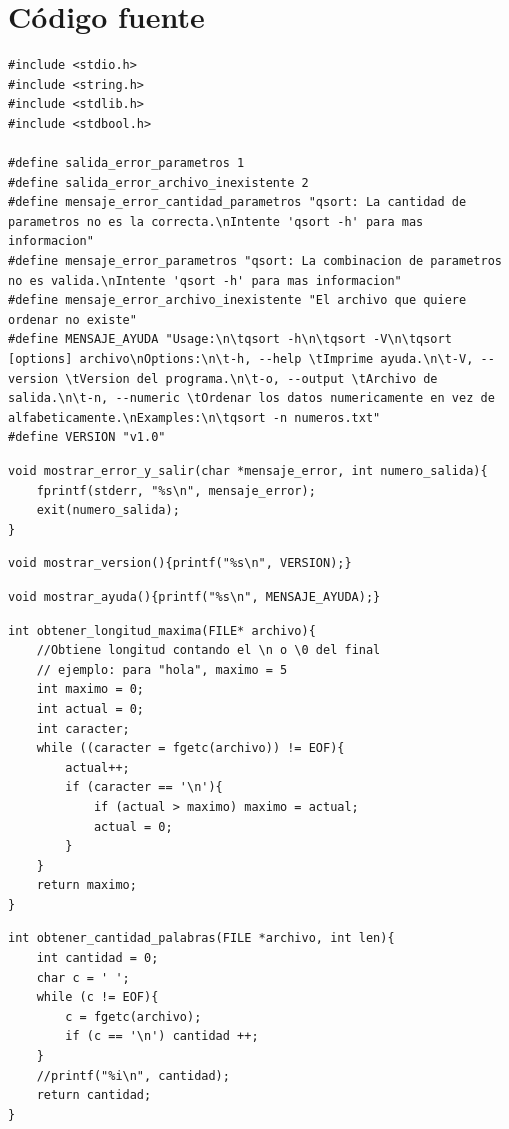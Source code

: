 \documentclass[a4paper, 12pt]{article}
\begin{document}
	\section{Código fuente}
	
	\begin{lstlisting}
#include <stdio.h>
#include <string.h>
#include <stdlib.h>
#include <stdbool.h>

#define salida_error_parametros 1
#define salida_error_archivo_inexistente 2
#define mensaje_error_cantidad_parametros "qsort: La cantidad de parametros no es la correcta.\nIntente 'qsort -h' para mas informacion"
#define mensaje_error_parametros "qsort: La combinacion de parametros no es valida.\nIntente 'qsort -h' para mas informacion"
#define mensaje_error_archivo_inexistente "El archivo que quiere ordenar no existe"
#define MENSAJE_AYUDA "Usage:\n\tqsort -h\n\tqsort -V\n\tqsort [options] archivo\nOptions:\n\t-h, --help \tImprime ayuda.\n\t-V, --version \tVersion del programa.\n\t-o, --output \tArchivo de salida.\n\t-n, --numeric \tOrdenar los datos numericamente en vez de alfabeticamente.\nExamples:\n\tqsort -n numeros.txt"
#define VERSION "v1.0"
	\end{lstlisting}
	
	\begin{lstlisting}
void mostrar_error_y_salir(char *mensaje_error, int numero_salida){
	fprintf(stderr, "%s\n", mensaje_error);
    exit(numero_salida);
}
	\end{lstlisting}
	
	\begin{lstlisting}
void mostrar_version(){printf("%s\n", VERSION);}
	\end{lstlisting}
	
	\begin{lstlisting}
void mostrar_ayuda(){printf("%s\n", MENSAJE_AYUDA);}
	\end{lstlisting}
	
	\begin{lstlisting}
int obtener_longitud_maxima(FILE* archivo){
    //Obtiene longitud contando el \n o \0 del final
    // ejemplo: para "hola", maximo = 5
    int maximo = 0;
    int actual = 0;
    int caracter;
    while ((caracter = fgetc(archivo)) != EOF){
        actual++;
        if (caracter == '\n'){
            if (actual > maximo) maximo = actual;
            actual = 0;
        }
    }
    return maximo;
}
	\end{lstlisting}
	
	\begin{lstlisting}
int obtener_cantidad_palabras(FILE *archivo, int len){
    int cantidad = 0;
    char c = ' ';
    while (c != EOF){
        c = fgetc(archivo);
        if (c == '\n') cantidad ++;
    }
    //printf("%i\n", cantidad);
    return cantidad;
}
	\end{lstlisting}
	
\end{document}
